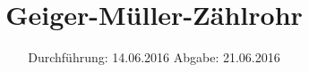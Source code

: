 

\subject{703}
\title{Geiger-Müller-Zählrohr}
\date{
  Durchführung: 14.06.2016
  \hspace{3em}
  Abgabe: 21.06.2016
}



\maketitle
\thispagestyle{empty}
\tableofcontents
\newpage






\printbibliography


